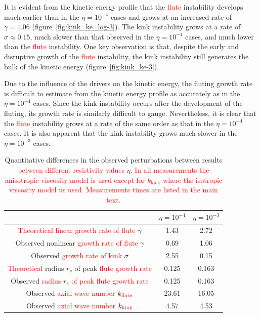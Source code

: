 \documentclass[12pt]{article}
\newcommand{\rs}[2]{\textcolor{red}{#2}}
\begin{document}
It is evident from the kinetic energy profile that the \rs{fluting}{flute} instability develops much earlier than in the $\eta=10^{-4}$ cases and grows at an increased rate of $\gamma = 1.06$ (figure~\ref{fig:kink_ke_log-3}). The kink instability grows at a rate of $\sigma \approx 0.15$, much slower than that observed in the $\eta=10^{-4}$ cases, and much lower than the \rs{fluting}{flute} instability. One key observation is that, despite the early and disruptive growth of the \rs{fluting}{flute} instability, the kink instability still generates the bulk of the kinetic energy (figure~\ref{fig:kink_ke-3}).

Due to the influence of the drivers on the kinetic energy, the fluting growth rate is difficult to estimate from the kinetic energy profile as accurately as in the $\eta=10^{-4}$ cases. Since the kink instability occurs after the development of the fluting, its growth rate is similarly difficult to gauge. Nevertheless, it is clear that the \rs{fluting}{flute} instability grows at a rate of the same order as that in the $\eta=10^{-4}$ cases. It is also apparent that the kink instability grows much slower in the $\eta=10^{-3}$ cases.

\begin{table}[]
\centering
\begin{tabular}{ccc}
&
$\eta=10^{-4}$ &
$\eta=10^{-3}$ \\
\midrule
\rs{Predicted linear}{Theoretical linear growth rate of flute} $\gamma$ & 1.43 & 2.72  \\
Observed nonlinear \rs{}{growth rate of flute} $\gamma$ & 0.69 & 1.06  \\
Observed \rs{}{growth rate of kink} $\sigma$ & 2.55 & 0.15\\
\midrule
\rs{}{Theoretical} radius $r_s$ of peak \rs{$\gamma$}{flute growth rate} & 0.125 & 0.163 \\
Observed \rs{}{radius} $r_s$ \rs{}{of peak flute growth rate} & 0.125 & 0.163 \\
\midrule
Observed \rs{}{axial wave number} $k_{\rs{flute}{\text{flute}}}$ & 23.61 & 16.05 \\
Observed \rs{}{axial wave number} $k_{\rs{kink}{\text{kink}}}$ & 4.57 & 4.53 \\
\end{tabular}
\caption{Quantitative differences in the observed perturbations
  between results \rs{for both values of}{between different
    resistivity values} $\eta$. \rs{}{In all measurements the
  anisotropic viscosity model is used except for $k_\text{kink}$ where the
  isotropic viscosity model us used. Measurements times are listed in
  the main text.}}
\label{tab:kink_fluting_params}
\end{table}
\end{document}
